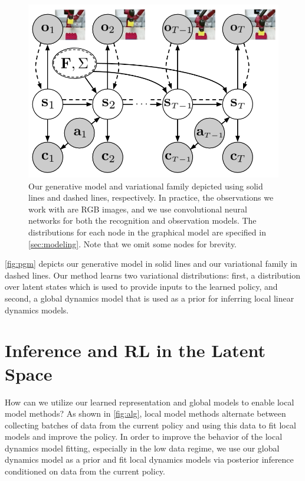 \begin{figure}
    \centering
    \includegraphics[width=0.9\linewidth]{img/solar/pgm.png}
    \caption{Our generative model and variational family depicted using solid lines and dashed lines, respectively. In practice, the observations we work with are RGB images, and we use convolutional neural networks for both the recognition and observation models. The distributions for each node in the graphical model are specified in \autoref{sec:modeling}. Note that we omit some nodes for brevity.}
    \label{fig:pgm}
    \vspace{-.5em}
\end{figure}

\autoref{fig:pgm} depicts our generative model in solid lines and our variational family in dashed lines. Our method learns two variational distributions: first, a distribution over latent states which is used to provide inputs to the learned policy, and second, a global dynamics model that is used as a prior for inferring local linear dynamics models.


\section{Inference and RL in the Latent Space}
\label{sec:inference}

How can we utilize our learned representation and global models to enable local model methods? As shown in \autoref{fig:alg}, local model methods alternate between collecting batches of data from the current policy and using this data to fit local models and improve the policy. In order to improve the behavior of the local dynamics model fitting, especially in the low data regime, we use our global dynamics model as a prior and fit local dynamics models via posterior inference conditioned on data from the current policy.

